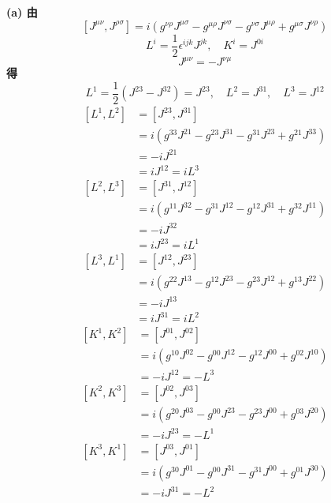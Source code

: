 \documentclass{article}
\begin{document}
\section{}
\bf{(a)}
由
$$
\left[J^{\mu \nu}, J^{\rho \sigma} \right] = i(g^{\nu \rho} J^{\mu \sigma} - g^{\mu \rho} J^{\nu \sigma}-g^{\nu \sigma} J^{\mu \rho}+g^{\mu \sigma} J^{\nu \rho}) $$
$$
L^{i} = \frac{1}{2} \epsilon^{ijk} J^{jk},\quad K^{i}=J^{0i} $$
$$
J^{\mu \nu} = - J^{\nu \mu}$$
得
$$
L^{1} = \frac{1}{2} (J^{23}-J^{32}) = J^{23}, \quad
L^{2} = J^{31}, \quad
L^{3} = J^{12} 
$$
\begin{align}
\left[L^1, L^2 \right] 	&=\left[J^{2 3}, J^{3 1} \right] \nonumber \\
						&=i(g^{3 3} J^{2 1} - g^{2 3} J^{3 1}-g^{3 1} J^{2 3}+g^{2 1} J^{3 3}) \nonumber \\
						&=-iJ^{2 1} \nonumber \\
						&= iJ^{12} = iL^3 \nonumber \\
\left[L^2, L^3 \right] 	&=\left[J^{3 1}, J^{1 2}  \right] \nonumber \\
						&= i(g^{1 1} J^{3 2} - g^{3 1} J^{1 2}-g^{1 2} J^{3 1}+g^{3 2} J^{1 1}) \nonumber \\
						&=-iJ^{32} \nonumber \\
						&= iJ^{23} = iL^1 \nonumber \\
\left[L^3, L^1 \right] 	&=\left[J^{1 2}, J^{2 3} \right] \nonumber \\
						&= i(g^{2 2} J^{1 3} - g^{1 2} J^{2 3}-g^{2 3} J^{1 2}+g^{1 3} J^{2 2}) \nonumber \\
						&=-iJ^{13} \nonumber \\
						&= iJ^{31} = iL^2 \nonumber 
\end{align}
\begin{align}
\left[K^1, K^2 \right] 	&=\left[J^{0 1}, J^{0 2} \right] \nonumber \\
						&= i(g^{1 0} J^{0 2} - g^{0 0} J^{1 2}-g^{1 2} J^{0 0}+g^{0 2} J^{1 0}) \nonumber \\
						&=-iJ^{12} = -L^{3} \nonumber \\
\left[K^2, K^3 \right] 	&=\left[J^{0 2}, J^{0 3} \right] \nonumber \\
						&= i(g^{2 0} J^{0 3} - g^{0 0} J^{2 3}-g^{2 3} J^{0 0}+g^{0 3} J^{2 0})\nonumber \\
						&=-iJ^{23} = -L^{1} \nonumber \\
\left[K^3, K^1 \right] 	&=\left[J^{0 3}, J^{0 1} \right] \nonumber \\
						&= i(g^{3 0} J^{0 1} - g^{0 0} J^{3 1}-g^{3 1} J^{0 0}+g^{0 1} J^{3 0}) \nonumber \\
						&=-iJ^{31} = -L^{2} \nonumber 
\end{align}
\end{document}
